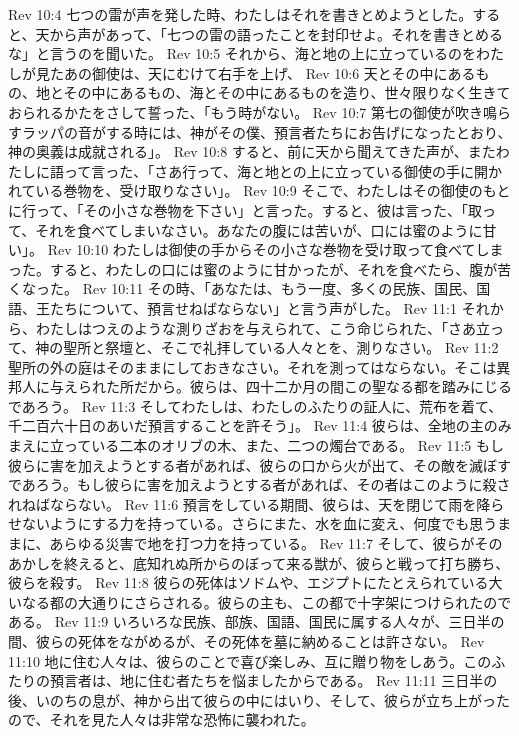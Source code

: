Rev 10:4  七つの雷が声を発した時、わたしはそれを書きとめようとした。すると、天から声があって、「七つの雷の語ったことを封印せよ。それを書きとめるな」と言うのを聞いた。
Rev 10:5  それから、海と地の上に立っているのをわたしが見たあの御使は、天にむけて右手を上げ、
Rev 10:6  天とその中にあるもの、地とその中にあるもの、海とその中にあるものを造り、世々限りなく生きておられるかたをさして誓った、「もう時がない。
Rev 10:7  第七の御使が吹き鳴らすラッパの音がする時には、神がその僕、預言者たちにお告げになったとおり、神の奥義は成就される」。
Rev 10:8  すると、前に天から聞えてきた声が、またわたしに語って言った、「さあ行って、海と地との上に立っている御使の手に開かれている巻物を、受け取りなさい」。
Rev 10:9  そこで、わたしはその御使のもとに行って、「その小さな巻物を下さい」と言った。すると、彼は言った、「取って、それを食べてしまいなさい。あなたの腹には苦いが、口には蜜のように甘い」。
Rev 10:10  わたしは御使の手からその小さな巻物を受け取って食べてしまった。すると、わたしの口には蜜のように甘かったが、それを食べたら、腹が苦くなった。
Rev 10:11  その時、「あなたは、もう一度、多くの民族、国民、国語、王たちについて、預言せねばならない」と言う声がした。
Rev 11:1  それから、わたしはつえのような測りざおを与えられて、こう命じられた、「さあ立って、神の聖所と祭壇と、そこで礼拝している人々とを、測りなさい。
Rev 11:2  聖所の外の庭はそのままにしておきなさい。それを測ってはならない。そこは異邦人に与えられた所だから。彼らは、四十二か月の間この聖なる都を踏みにじるであろう。
Rev 11:3  そしてわたしは、わたしのふたりの証人に、荒布を着て、千二百六十日のあいだ預言することを許そう」。
Rev 11:4  彼らは、全地の主のみまえに立っている二本のオリブの木、また、二つの燭台である。
Rev 11:5  もし彼らに害を加えようとする者があれば、彼らの口から火が出て、その敵を滅ぼすであろう。もし彼らに害を加えようとする者があれば、その者はこのように殺されねばならない。
Rev 11:6  預言をしている期間、彼らは、天を閉じて雨を降らせないようにする力を持っている。さらにまた、水を血に変え、何度でも思うままに、あらゆる災害で地を打つ力を持っている。
Rev 11:7  そして、彼らがそのあかしを終えると、底知れぬ所からのぼって来る獣が、彼らと戦って打ち勝ち、彼らを殺す。
Rev 11:8  彼らの死体はソドムや、エジプトにたとえられている大いなる都の大通りにさらされる。彼らの主も、この都で十字架につけられたのである。
Rev 11:9  いろいろな民族、部族、国語、国民に属する人々が、三日半の間、彼らの死体をながめるが、その死体を墓に納めることは許さない。
Rev 11:10  地に住む人々は、彼らのことで喜び楽しみ、互に贈り物をしあう。このふたりの預言者は、地に住む者たちを悩ましたからである。
Rev 11:11  三日半の後、いのちの息が、神から出て彼らの中にはいり、そして、彼らが立ち上がったので、それを見た人々は非常な恐怖に襲われた。

